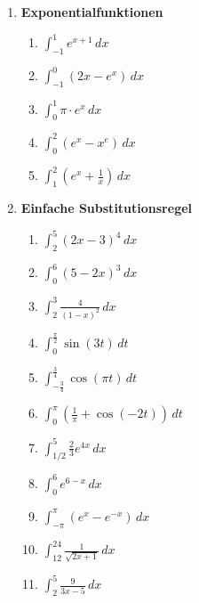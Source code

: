 \begin{ueb}
\begin{enumerate}
		\item \textbf{Exponentialfunktionen}
		      \begin{enumerate}
			      \item \(\displaystyle \int_{-1}^1 e^{x+1} \, dx \)
			      \item \(\displaystyle \int_{-1}^0 (2x - e^x) \, dx \)
			      \item \(\displaystyle \int_0^1 \pi \cdot e^x \, dx \)
			      \item \(\displaystyle \int_0^2 (e^x - x^e) \, dx \)
			      \item \(\displaystyle \int_1^2 \left(e^x + \frac{1}{x}\right) \, dx \)
		      \end{enumerate}

		\item \textbf{Einfache Substitutionsregel}
		      \begin{enumerate}
			      \item \(\displaystyle \int_2^5 (2x - 3)^4 \, dx \)
			      \item \(\displaystyle \int_0^6 (5 - 2x)^3 \, dx \)
			      \item \(\displaystyle \int_2^3 \frac{4}{(1 - x)^2} \, dx \)
			      \item \(\displaystyle \int_0^{\frac{\pi}{2}} \sin(3t) \, dt \)
			      \item \(\displaystyle \int_{-\frac{3}{4}}^{\frac{3}{4}} \cos(\pi t) \, dt \)
			      \item \(\displaystyle \int_0^\pi \left(\frac{1}{\pi} + \cos(-2t)\right) \, dt \)
			      \item \(\displaystyle \int_{1/2}^5 \frac{2}{3} e^{4x} \, dx \)
			      \item \(\displaystyle \int_0^6 e^{6 - x} \, dx \)
			      \item \(\displaystyle \int_{-\pi}^\pi (e^x - e^{-x}) \, dx \)
			      \item \(\displaystyle \int_{12}^{24} \frac{1}{\sqrt{2x + 1}} \, dx \)
			      \item \(\displaystyle \int_2^5 \frac{9}{3x - 5} \, dx \)
		      \end{enumerate}


	\end{enumerate}

\end{ueb}


